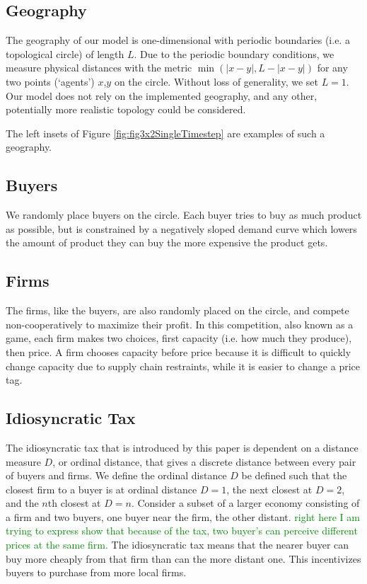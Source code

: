 \documentclass[11pt]{article}
\newcommand{\green}[1]{\textcolor{Green}{#1}} %
\begin{document}
\subsection{Geography}
The geography of our model is one-dimensional with periodic boundaries (i.e.
a topological circle) of length $L$. Due to the periodic boundary conditions,
we measure physical distances with the metric $\min(|x-y|, L-|x-y|)$ for any
two points (`agents') $x$,$y$ on the circle. Without loss of generality, we set
$L=1$. Our model does not rely on the implemented geography, and any other,
potentially more realistic topology could be considered.

The left insets of Figure \ref{fig:fig3x2SingleTimestep} are examples of
such a geography.

\subsection{Buyers}
We randomly place buyers on the circle. Each buyer tries to buy as much product
as possible, but is constrained by a negatively sloped demand curve which
lowers the amount of product they can buy the more expensive the product gets.

\subsection{Firms}
The firms, like the buyers, are also randomly placed on the circle, and compete
non-cooperatively to maximize their profit. In this competition, also known as
a game, each firm makes two choices, first capacity (i.e. how much they
produce), then price. A firm chooses capacity before price because it is
difficult to quickly change capacity due to supply chain restraints, while it
is easier to change a price tag.

\subsection{Idiosyncratic Tax}
The idiosyncratic tax that is introduced by this paper is dependent on a
distance measure $D$, or ordinal distance, that gives a discrete distance
between every pair of buyers and firms. We define the ordinal distance $D$ be
defined such that the closest firm to a buyer is at ordinal distance $D=1$, the
next closest at $D=2$, and the $n$th closest at $D=n$. Consider a subset of a
larger economy consisting of a firm and two buyers, one buyer near the firm,
the other distant. \green{right here I am trying to express show that because
of the tax, two buyer's can perceive different prices at the same firm.} The
idiosyncratic tax means that the nearer buyer can buy more cheaply from that
firm than can the more distant one. This incentivizes buyers to purchase from
more local firms.
\end{document}
